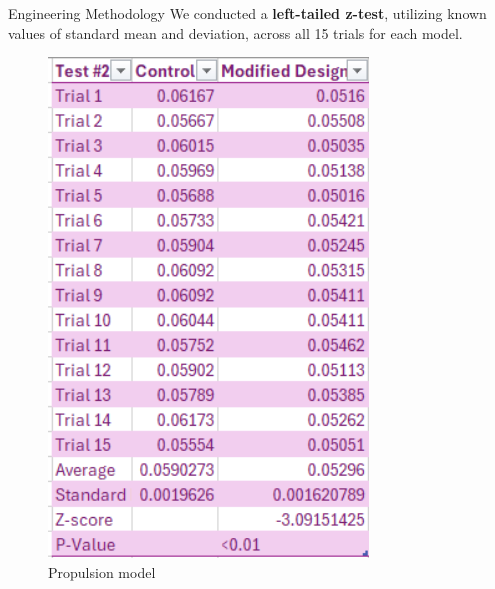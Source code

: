 \documentclass[final, 16pt]{beamer}
\newlength{\colwidth}
\newlength{\twocolwidth}
\begin{document}
\begin{frame}[t]
\begin{columns}[t]
\begin{column}{\twocolwidth}
\begin{block}{Engineering Methodology}
    We conducted a \textbf{left-tailed z-test}, utilizing known values of standard mean and deviation, across all 15 trials for each model.
    
    \vspace{1cm}

    \begin{minipage}[t]{0.48\linewidth}
      \begin{multicols}{2}
        \centering

        \vspace{0.5cm}

        \begin{figure}[H]
          \centering
          \includegraphics[height=13.25cm]{img/Propulsion_Model_Table.png}
          \caption{Propulsion model}
          \label{fig:propulsion-table}
          \vfill
        \end{figure}
    

\end{multicols}
\end{minipage}
\end{block}
\end{column}
\end{columns}
\end{frame}
\end{document}
